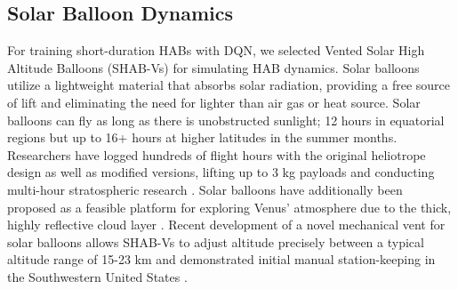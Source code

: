 \subsection{Solar Balloon Dynamics}\label{section:SimEnvforDQN_SolarBalloonDynamics}

For training short-duration HABs with DQN, we selected Vented Solar High Altitude Balloons (SHAB-Vs) for simulating HAB dynamics. Solar balloons utilize a lightweight material that absorbs solar radiation, providing a free source of lift and eliminating the need for lighter than air gas or heat source. Solar balloons can fly as long as there is unobstructed sunlight; 12 hours in equatorial regions but up to 16+ hours at higher latitudes in the summer months. Researchers have logged hundreds of flight hours with the original heliotrope design as well as modified versions, lifting up to 3 kg payloads and conducting multi-hour stratospheric research \cite{bowman2020multihour, schuler2022solar, swaim2024performance, Lien2024EarthSHAB}.  Solar balloons have additionally been proposed as a feasible platform for exploring Venus' atmosphere due to the thick, highly reflective cloud layer \cite{schuler2022long}. Recent development of a novel mechanical vent for solar balloons allows SHAB-Vs to adjust altitude precisely between a typical altitude range of 15-23 km and demonstrated initial manual station-keeping in the Southwestern United States \cite{schuler2023altitude}.  






